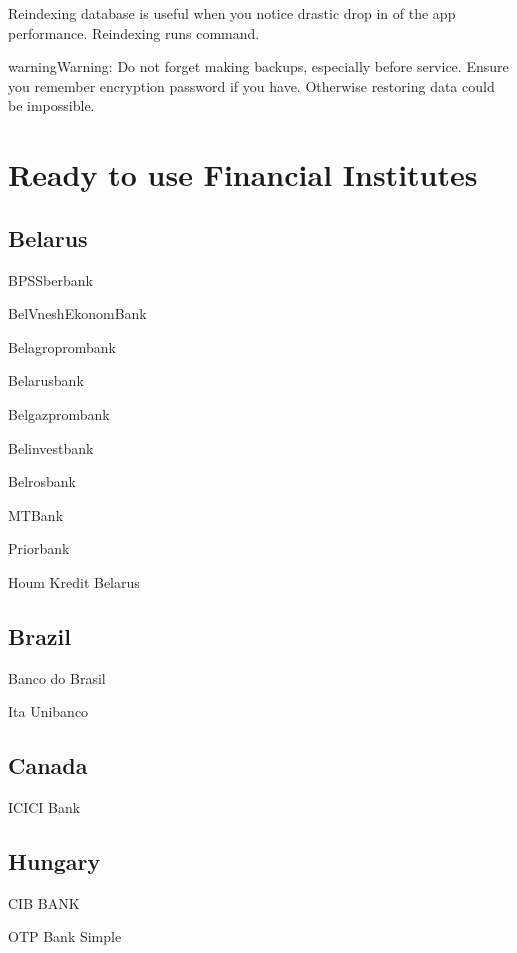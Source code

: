 \documentclass[a4paper,10pt,english]{sphinxmanual}
\begin{document}
Reindexing database is useful when you notice drastic drop in of the app performance.
Reindexing runs  command.

\begin{sphinxadmonition}{warning}{Warning:}
Do not forget making backups, especially before service. Ensure you remember encryption password if you have. Otherwise restoring data could be impossible.
\end{sphinxadmonition}


\chapter{Ready to use Financial Institutes}
\label{\detokenize{banks:ready-to-use-financial-institutes}}\label{\detokenize{banks:chapter-supported-banks}}\label{\detokenize{banks::doc}}

\section{Belarus}
\label{\detokenize{banks:belarus}}
BPSSberbank

BelVneshEkonomBank

Belagroprombank

Belarusbank

Belgazprombank

Belinvestbank

Belrosbank

MTBank

Priorbank

Houm Kredit Belarus


\section{Brazil}
\label{\detokenize{banks:brazil}}
Banco do Brasil

Ita Unibanco


\section{Canada}
\label{\detokenize{banks:canada}}
ICICI Bank


\section{Hungary}
\label{\detokenize{banks:hungary}}
CIB BANK

OTP Bank  Simple
\end{document}
